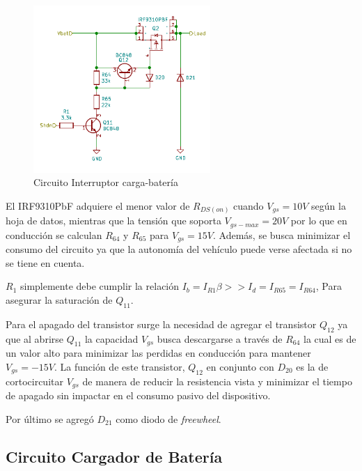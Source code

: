 \documentclass[10pt, a4paper]{article}
\begin{document}
\begin{figure}[h!]
	\begin{center}
		\includegraphics[width=0.6\textwidth]{kcd_bat_load_switch.pdf}
		\caption{Circuito Interruptor carga-batería}
		\label{load_sw_sch}
	\end{center}
\end{figure}
\FloatBarrier

El IRF9310PbF adquiere el menor valor de $R_{DS(on)}$ cuando $V_{gs} = 10V$
según la hoja de datos\cite{IRF9310}, mientras que la tensión que soporta
$V_{gs-max}=20V$ por lo que en conducción se calculan $R_{64}$ y $R_{65}$ para
$V_{gs}=15V$.
Además, se busca minimizar el consumo del circuito ya que la autonomía del
vehículo puede verse afectada si no se tiene en cuenta.

$R_1$ simplemente debe cumplir la relación $I_b = I_{R1} \beta >> I_d = I_{R65}
= I_{R64}$, Para asegurar la saturación de $Q_{11}$. 

Para el apagado del transistor surge la necesidad de agregar el transistor
$Q_{12}$ ya que al abrirse $Q_{11}$ la capacidad $V_{gs}$ busca descargarse a
través de $R_{64}$ la cual es de un valor alto para minimizar las perdidas en
conducción para mantener $V_{gs}=-15V$. La función de este transistor, $Q_{12}$
en conjunto con $D_{20}$ es la de cortocircuitar $V_{gs}$ de manera de reducir
la resistencia vista y minimizar el tiempo de apagado sin impactar en el consumo
pasivo del dispositivo.

Por último se agregó $D_{21}$ como diodo de \emph{freewheel}.

\subsection{Circuito Cargador de Batería}
\end{document}
